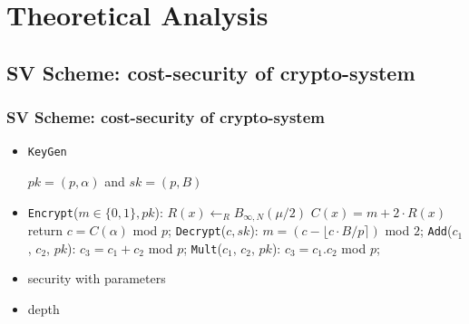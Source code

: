\documentclass{beamer}
\begin{document}
\section{Theoretical Analysis}

\subsection{SV Scheme: cost-security of crypto-system}

\begin{frame} \frametitle{SV Scheme: cost-security of crypto-system}
  \begin{itemize}
  \item \texttt{KeyGen}

    $pk = (p, \alpha)$ and $sk = (p , B)$
    \pause
  \item  \texttt{Encrypt}($m \in \{0,1\} , pk$): 
    \newline   $R(x) \leftarrow_{R}B_{\infty , N}(\mu/2)$
    \; $C(x)=m+2\cdot R(x)$ 
    \newline \phantom{x}\hspace{3ex} return  $c=C(\alpha)$ mod $p$;
    \newline \texttt{Decrypt}($c, sk$):
    \newline \phantom{x}\hspace{3ex} $m = (c - \lfloor c \cdot B/p \rceil )$ mod $2$;
    \newline \texttt{Add}($c_1$, $c_2$, $pk$):
    \newline \phantom{x}\hspace{3ex} $c_3=c_1+c_2$ mod $p$; 
    \newline \texttt{Mult}($c_1$, $c_2$, $pk$):
    \newline \phantom{x}\hspace{3ex}  $c_3=c_1.c_2$ mod $p$; 
    \pause

  \item security with parameters
  \item depth
  \end{itemize}
\end{frame}
\end{document}
